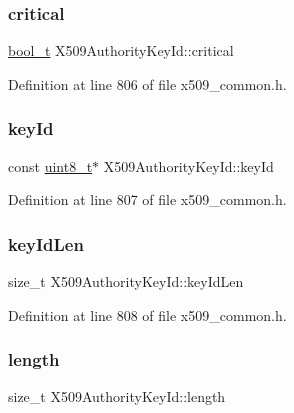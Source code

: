 \subsubsection{\texorpdfstring{critical}{critical}}
{\footnotesize\ttfamily \hyperlink{compiler__port_8h_a812d16e5494522586b3784e55d479912}{bool\+\_\+t} X509\+Authority\+Key\+Id\+::critical}



Definition at line 806 of file x509\+\_\+common.\+h.

\mbox{\label{structX509AuthorityKeyId_ab96ff029d18bc7035b698c9b0daa9681}} 
\subsubsection{\texorpdfstring{key\+Id}{keyId}}
{\footnotesize\ttfamily const \hyperlink{stdint_8h_aba7bc1797add20fe3efdf37ced1182c5}{uint8\+\_\+t}$\ast$ X509\+Authority\+Key\+Id\+::key\+Id}



Definition at line 807 of file x509\+\_\+common.\+h.

\mbox{\label{structX509AuthorityKeyId_ae1cbf5840bbe41649ea904a2f787278d}} 
\subsubsection{\texorpdfstring{key\+Id\+Len}{keyIdLen}}
{\footnotesize\ttfamily size\+\_\+t X509\+Authority\+Key\+Id\+::key\+Id\+Len}



Definition at line 808 of file x509\+\_\+common.\+h.

\mbox{\label{structX509AuthorityKeyId_ad786e919eade63c0dd214834c7c0728b}} 
\subsubsection{\texorpdfstring{length}{length}}
{\footnotesize\ttfamily size\+\_\+t X509\+Authority\+Key\+Id\+::length}



